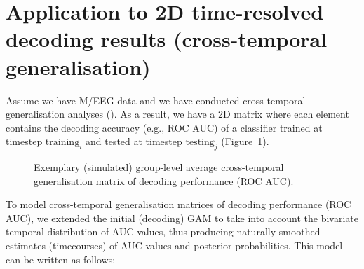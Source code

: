 \documentclass[
  man,
  floatsintext,
  longtable,
  a4paper,
  nolmodern,
  notxfonts,
  notimes,
  colorlinks=true,linkcolor=blue,citecolor=blue,urlcolor=blue]{apa7}
\begin{document}
\newpage

\appendix

\section{Application to 2D time-resolved decoding results
(cross-temporal
generalisation)}\label{application-to-2d-time-resolved-decoding-results-cross-temporal-generalisation}

Assume we have M/EEG data and we have conducted cross-temporal
generalisation analyses (). As a result, we have a 2D matrix where each element contains the
decoding accuracy (e.g., ROC AUC) of a classifier trained at timestep
\(\text{training}_{i}\) and tested at timestep \(\text{testing}_{j}\)
(Figure~\ref{fig-sim-timegen}).

\begin{figure}[!htb]

\caption{\label{fig-sim-timegen}Exemplary (simulated) group-level
average cross-temporal generalisation matrix of decoding performance
(ROC AUC).}


\end{figure}%

To model cross-temporal generalisation matrices of decoding performance
(ROC AUC), we extended the initial (decoding) GAM to take into account
the bivariate temporal distribution of AUC values, thus producing
naturally smoothed estimates (timecourses) of AUC values and posterior
probabilities. This model can be written as follows:
\end{document}
